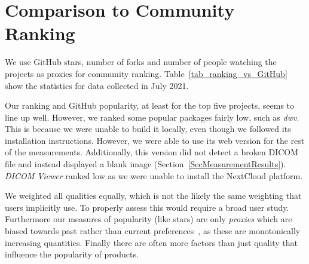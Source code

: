 \documentclass[doubleblind,12pt, 3p, times]{elsarticle}
\begin{document}
\section{Comparison to Community Ranking} \label{Sec_VsCommunityRanking}

We use GitHub stars, number of forks and
number of people watching the projects as proxies for community ranking.
Table~\ref{tab_ranking_vs_GitHub} show the statistics for data collected in July
2021.

Our ranking and GitHub popularity, at least for the top five projects, seems to
line up well. However, we ranked some popular packages fairly low, such
as \textit{dwv}. This is because we were unable to build it locally, even though
we followed its installation instructions. However, we were able to use its web
version for the rest of the measurements. Additionally, this version did not
detect a broken DICOM file and instead displayed a blank image
(Section~\ref{SecMeasurementResults}).  \textit{DICOM Viewer} ranked low as we
were unable to install the NextCloud platform.

We weighted all qualities equally, which is not the likely the same weighting
that users implicitly use. To properly assess this would require a broad user
study.  Furthermore our measures of popularity (like stars) are only \emph{proxies} which
are biased towards past rather than current preferences~\cite{Szulik2017}, as
these are monotonically increasing quantities. Finally there are often more
factors than just quality that influence the popularity of 
products.
\end{document}
